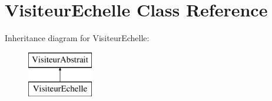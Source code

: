 \hypertarget{class_visiteur_echelle}{}\section{Visiteur\+Echelle Class Reference}
\label{class_visiteur_echelle}
Inheritance diagram for Visiteur\+Echelle\+:\begin{figure}[H]
\begin{center}
\leavevmode
\includegraphics[height=2.000000cm]{class_visiteur_echelle}
\end{center}
\end{figure}
